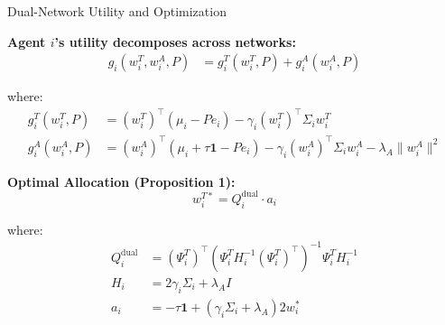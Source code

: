 \documentclass[aspectratio=169]{beamer}
\begin{document}
\begin{frame}{Dual-Network Utility and Optimization}
    
    \textbf{Agent $i$'s utility decomposes across networks:}
    \begin{align*}
    g_i(w_i^T, w_i^A, P) &= g_i^T(w_i^T, P) + g_i^A(w_i^A, P)
    \end{align*}
    
    where:
    \begin{align*}
    g_i^T(w_i^T, P) &= (w_i^T)^\top(\mu_i - Pe_i) - \gamma_i (w_i^T)^\top\Sigma_i w_i^T \\
    g_i^A(w_i^A, P) &= (w_i^A)^\top(\mu_i + \tau \mathbf{1} - Pe_i) - \gamma_i (w_i^A)^\top\Sigma_i w_i^A - \lambda_A\|w_i^A\|^2
    \end{align*}
    
    \vspace{0.3cm}
    \textbf{Optimal Allocation (Proposition 1):}
    \begin{equation*}
    w_i^{T*} = Q_i^{\text{dual}} \cdot a_i
    \end{equation*}
    
    where:
    \begin{align*}
    Q_i^{\text{dual}} &= (\Psi_i^T)^\top(\Psi_i^T H_i^{-1} (\Psi_i^T)^\top)^{-1}\Psi_i^T H_i^{-1} \\
    H_i &= 2\gamma_i\Sigma_i + \lambda_A I \\
    a_i &= -\tau \mathbf{1} + (\gamma_i\Sigma_i + \lambda_A )2 w_i^*
    \end{align*}

\end{frame}
\end{document}
